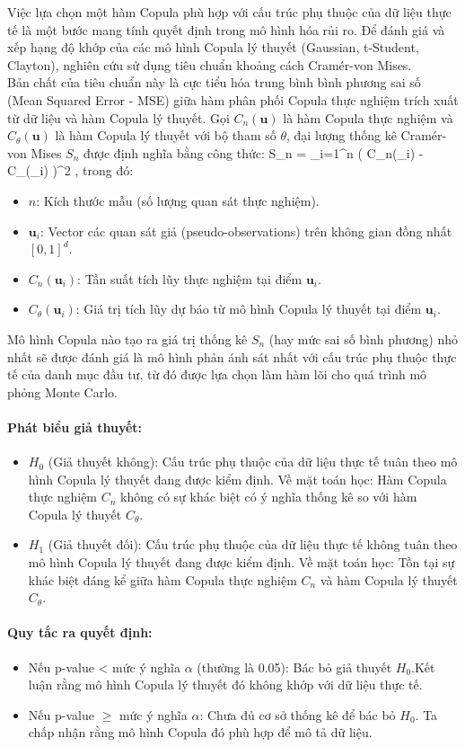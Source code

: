 Việc lựa chọn một hàm Copula phù hợp với cấu trúc phụ thuộc của dữ liệu thực tế là một bước mang tính quyết định trong mô hình hóa rủi ro. Để đánh giá và xếp hạng độ khớp của các mô hình Copula lý thuyết (Gaussian, t-Student, Clayton), nghiên cứu sử dụng tiêu chuẩn khoảng cách Cramér-von Mises.\\
Bản chất của tiêu chuẩn này là cực tiểu hóa trung bình bình phương sai số (Mean Squared Error - MSE) giữa hàm phân phối Copula thực nghiệm trích xuất từ dữ liệu và hàm Copula lý thuyết. Gọi $C_n(\mathbf{u})$ là hàm Copula thực nghiệm và $C_\theta(\mathbf{u})$ là hàm Copula lý thuyết với bộ tham số $\theta$, đại lượng thống kê Cramér-von Mises $S_n$ được định nghĩa bằng công thức:
\bea
 S_n = \sum_{i=1}^{n} \left( C_n(_i) - C_\theta(_i) \right)^2 , 
\eea
trong đó:
\begin{itemize}
    \item $n$: Kích thước mẫu (số lượng quan sát thực nghiệm).
    \item $\mathbf{u}_i$: Vector các quan sát giả (pseudo-observations) trên không gian đồng nhất $[0,1]^d$.
    \item $C_n(\mathbf{u}_i)$: Tần suất tích lũy thực nghiệm tại điểm $\mathbf{u}_i$.
    \item $C_\theta(\mathbf{u}_i)$: Giá trị tích lũy dự báo từ mô hình Copula lý thuyết tại điểm $\mathbf{u}_i$.
\end{itemize}

Mô hình Copula nào tạo ra giá trị thống kê $S_n$ (hay mức sai số bình phương) nhỏ nhất sẽ được đánh giá là mô hình phản ánh sát nhất với cấu trúc phụ thuộc thực tế của danh mục đầu tư, từ đó được lựa chọn làm hàm lõi cho quá trình mô phỏng Monte Carlo.
\paragraph{Phát biểu giả thuyết:}
\begin{itemize}
    \item $H_0$ (Giả thuyết không): Cấu trúc phụ thuộc của dữ liệu thực tế tuân theo mô hình Copula lý thuyết đang được kiểm định. Về mặt toán học: Hàm Copula thực nghiệm $C_n$ không có sự khác biệt có ý nghĩa thống kê so với hàm Copula lý thuyết $C_\theta$.
    \item $H_1$ (Giả thuyết đối): Cấu trúc phụ thuộc của dữ liệu thực tế không tuân theo mô hình Copula lý thuyết đang được kiểm định. Về mặt toán học: Tồn tại sự khác biệt đáng kể giữa hàm Copula thực nghiệm $C_n$ và hàm Copula lý thuyết $C_\theta$.
\end{itemize} 
\paragraph{Quy tắc ra quyết định:} 
\begin{itemize}
    \item Nếu p-value < mức ý nghĩa $\alpha$ (thường là 0.05): Bác bỏ giả thuyết $H_0$.Kết luận rằng mô hình Copula lý thuyết đó không khớp với dữ liệu thực tế.
    \item Nếu p-value $\ge$ mức ý nghĩa $\alpha$: Chưa đủ cơ sở thống kê để bác bỏ $H_0$. Ta chấp nhận rằng mô hình Copula đó phù hợp để mô tả dữ liệu.
\end{itemize}
\cite{genest2009goodness}